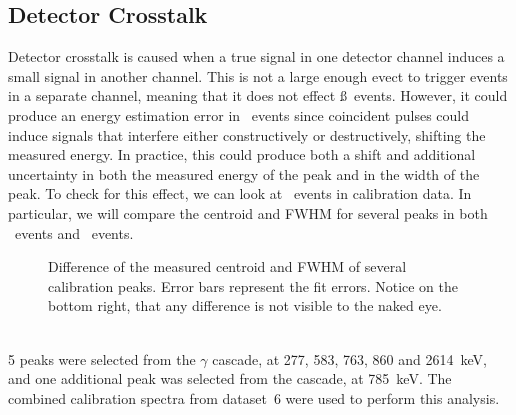 \documentclass[/main.tex]{subfiles}
\begin{document}
\subsection{Detector Crosstalk}
Detector crosstalk is caused when a true signal in one detector channel induces a small signal in another channel.
This is not a large enough evect to trigger events in a separate channel, meaning that it does not effect \ss\ events.
However, it could produce an energy estimation error in \md\ events since coincident pulses could induce signals that interfere either constructively or destructively, shifting the measured energy.
In practice, this could produce both a shift and additional uncertainty in both the measured energy of the peak and in the width of the peak.
To check for this effect, we can look at \md\ events in  calibration data.
In particular, we will compare the centroid and FWHM for several peaks in both \sd\ events and \md\ events.
\begin{figure}[p]
  \centering
  \caption[Peak shape comparison for single- and multi-detector events]{\label{fig:xtalk}
    Difference of the measured centroid and FWHM of several  calibration peaks. Error bars represent the fit errors. Notice on the bottom right, that any difference is not visible to the naked eye.
  }
\end{figure}
\\
5 peaks were selected from the  $\gamma$ cascade, at 277, 583, 763, 860 and 2614~keV, and one additional peak was selected from the  cascade, at 785~keV.
The combined calibration spectra from dataset~6 were used to perform this analysis.
\end{document}
